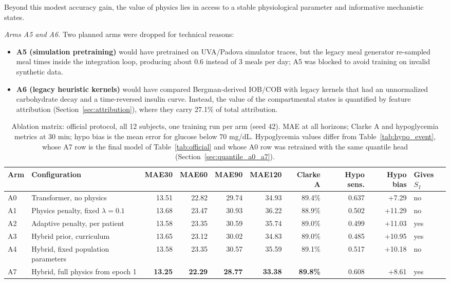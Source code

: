 \documentclass[journal]{IEEEtran}
\begin{document}
Beyond this modest accuracy gain, the value of physics lies in access to a stable physiological parameter and informative mechanistic states.

\textit{Arms A5 and A6.} Two planned arms were dropped for technical reasons:
\begin{itemize}
    \item \textbf{A5 (simulation pretraining)} would have pretrained on UVA/Padova simulator traces, but the legacy meal generator re-sampled meal times inside the integration loop, producing about 0.6 instead of 3 meals per day; A5 was blocked to avoid training on invalid synthetic data.
    \item \textbf{A6 (legacy heuristic kernels)} would have compared Bergman-derived IOB/COB with legacy kernels that had an unnormalized carbohydrate decay and a time-reversed insulin curve. Instead, the value of the compartmental states is quantified by feature attribution (Section~\ref{sec:attribution}), where they carry 27.1\% of total attribution.
\end{itemize}


\begin{table}[t]
\centering

\caption{Ablation matrix: official protocol, all 12 subjects, one training run per arm (seed 42). MAE at all horizons; Clarke A and hypoglycemia metrics at 30 min; hypo bias is the mean error for glucose below 70 mg/dL. Hypoglycemia values differ from Table~\ref{tab:hypo_event}, whose A7 row is the final model of Table~\ref{tab:official} and whose A0 row was retrained with the same quantile head (Section~\ref{sec:quantile_a0_a7}).}
\label{tab:ablation}
\footnotesize
\setlength{\tabcolsep}{4.5pt}
\begin{tabular}{llrrrrrrrl}
\toprule
Arm & Configuration & MAE30 & MAE60 & MAE90 & MAE120 & Clarke A & Hypo sens. & Hypo bias & Gives $S_I$ \\
\midrule
A0 & Transformer, no physics & 13.51 & 22.82 & 29.74 & 34.93 & 89.4\% & 0.637 & +7.29 & no \\
A1 & Physics penalty, fixed $\lambda=0.1$ & 13.68 & 23.47 & 30.93 & 36.22 & 88.9\% & 0.502 & +11.29 & no \\
A2 & Adaptive penalty, per patient & 13.58 & 23.35 & 30.59 & 35.74 & 89.0\% & 0.499 & +11.03 & yes \\
A3 & Hybrid prior, curriculum & 13.65 & 23.12 & 30.02 & 34.83 & 89.0\% & 0.485 & +10.95 & yes \\
A4 & Hybrid, fixed population parameters & 13.58 & 23.35 & 30.57 & 35.59 & 89.1\% & 0.517 & +10.18 & no \\
A7 & Hybrid, full physics from epoch 1 & \textbf{13.25} & \textbf{22.29} & \textbf{28.77} & \textbf{33.38} & \textbf{89.8\%} & 0.608 & +8.61 & yes \\
\bottomrule
\end{tabular}
\end{table}
\end{document}
